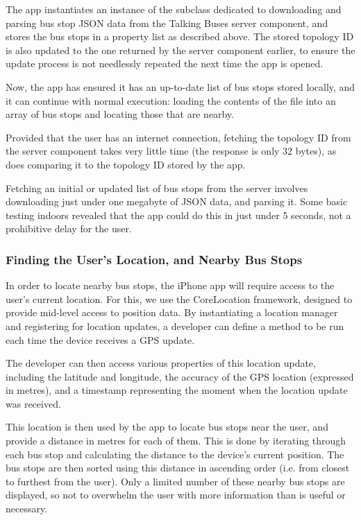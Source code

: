\documentclass[10pt,twocolumn]{article}
\begin{document}
The app instantiates an instance of the subclass dedicated to downloading and parsing bus stop JSON data from the Talking Buses server component, and stores the bus stops in a property list as described above. The stored topology ID is also updated to the one returned by the server component earlier, to ensure the update process is not needlessly repeated the next time the app is opened.

Now, the app has ensured it has an up-to-date list of bus stops stored locally, and it can continue with normal execution: loading the contents of the file into an array of bus stops and locating those that are nearby.

Provided that the user has an internet connection, fetching the topology ID from the server component takes very little time (the response is only 32 bytes), as does comparing it to the topology ID stored by the app.

Fetching an initial or updated list of bus stops from the server involves downloading just under one megabyte of JSON data, and parsing it. Some basic testing indoors revealed that the app could do this in just under 5 seconds, not a prohibitive delay for the user.

\subsubsection{Finding the User's Location, and Nearby Bus Stops}
In order to locate nearby bus stops, the iPhone app will require access to the user's current location. For this, we use the CoreLocation framework, designed to provide mid-level access to position data. By instantiating a location manager and registering for location updates, a developer can define a method to be run each time the device receives a GPS update.

The developer can then access various properties of this location update, including the latitude and longitude, the accuracy of the GPS location (expressed in metres), and a timestamp representing the moment when the location update was received.

This location is then used by the app to locate bus stops near the user, and provide a distance in metres for each of them. This is done by iterating through each bus stop and calculating the distance to the device's current position. The bus stops are then sorted using this distance in ascending order (i.e. from closest to furthest from the user). Only a limited number of these nearby bus stops are displayed, so not to overwhelm the user with more information than is useful or necessary.
\end{document}
